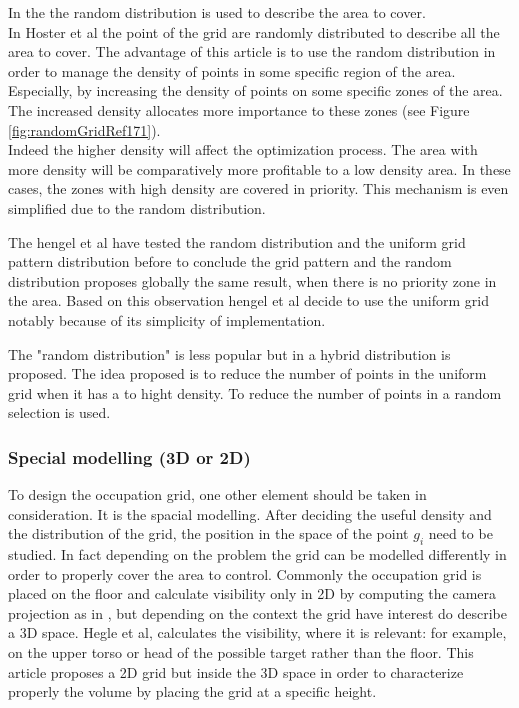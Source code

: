  In the  \cite{83*van2009,171*horster2006} the random distribution is used to describe the area to cover. \\
In Hoster et al \citep{171*horster2006} the point of the grid are randomly distributed to describe all the area to cover. The advantage of this article is to use the random distribution in order to manage the density of points in some specific region of the area. Especially, by increasing the density of points on some specific zones of the area. The increased density allocates more importance to these zones (see Figure \ref{fig:randomGridRef171}).\\
Indeed the higher density will affect the optimization process. The area with more density will be comparatively more profitable to a low density area. In these cases, the zones with high density are covered in priority. This mechanism is even simplified due to the random distribution.

The hengel et al \cite{83*van2009} have tested the random distribution and the uniform grid pattern distribution before to conclude the grid pattern and the random distribution proposes globally the same result, when there is no priority zone in the area. Based on this observation hengel et al \cite{83*van2009} decide to use the uniform grid notably because of its simplicity of implementation.

The "random distribution" is less popular but in \cite{22*zhao2008} a hybrid distribution is proposed. The idea proposed is to reduce the number of points in the uniform grid when it has a to hight density. To reduce the number of points in a random  selection is used. 



\subsubsection{ Special modelling (3D  or 2D)}
To design the occupation grid, one other element should be taken in consideration. It is the spacial modelling. After deciding the useful density and the distribution of the grid, the position in the space of the point $g_i$ need to be studied.  
In fact depending on the problem the grid can be modelled differently in order to properly cover the area to control. Commonly the occupation grid is placed on the floor and calculate visibility only in 2D  by computing the  camera projection as in  \citep{164*valente2013,150*chakrabarty2002,8*zhou2011,170*yabuta2008,171*horster2006,22*zhao2008}, but depending on the context the grid have interest do describe a 3D space.  
Hegle et al\cite{83*van2009}, calculates the visibility, where it is relevant: for example, on the upper torso or head of the possible target rather than the floor. This article  proposes a 2D grid but inside the 3D space in order to  characterize properly the volume by placing the grid at a specific height.  

